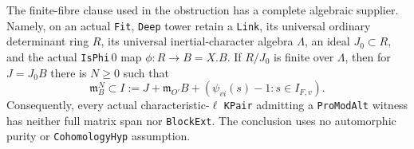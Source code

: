 \begin{proposition}
\label{claim:IX9}
The finite-fibre clause used in the obstruction has a
complete algebraic supplier.  Namely, on an actual
\texttt{Fit}, \texttt{Deep} tower retain a
\texttt{Link}, its universal ordinary determinant ring
$R$, its universal inertial-character algebra $\Lambda$,
an ideal $J_0\subset R$, and the actual
\texttt{IsPhi}$\,0$ map $\phi:R\to B=X.B$.
If $R/J_0$ is finite over $\Lambda$, then for
$J=J_0B$ there is $N\ge0$ such that
\[
 \mathfrak m_B^N\subset
 I:=J+\mathfrak m_{O'}B+
       (\psi_{vi}(s)-1:s\in I_{F,v}).
 \tag{IX.27}
\]
Consequently, every actual characteristic-$\ell$
\texttt{KPair} admitting a \texttt{ProModAlt} witness
has neither full matrix span nor \texttt{BlockExt}.
The conclusion uses no automorphic purity or
\texttt{CohomologyHyp} assumption.
\end{proposition}

